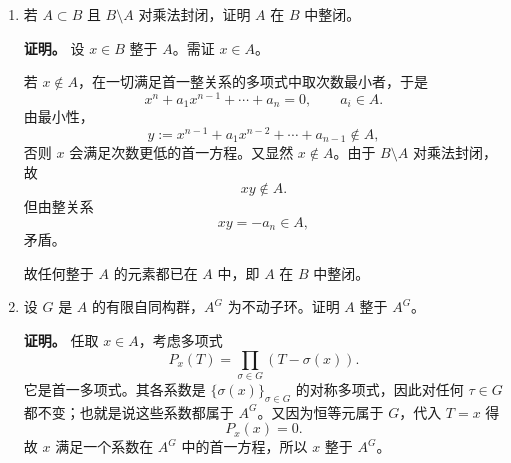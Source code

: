 \documentclass[a4paper]{ctexart}
\begin{document}
\begin{enumerate}[leftmargin=*, label=\textbf{5.\arabic*.}]
\textbf{证明。}
\begin{enumerate}[label=(\roman*)]
\item 设 \(x^{-1}\in B\)。因为 \(B\) 整于 \(A\)，故 \(x^{-1}\) 整于 \(A\)。于是存在首一方程
\[
(x^{-1})^n+a_1(x^{-1})^{n-1}+\cdots+a_n=0,\qquad a_i\in A.
\]
两边乘以 \(x^{n-1}\)，得
\[
x^{-1}+a_1+a_2x+\cdots+a_nx^{n-1}=0,
\]
即
\[
x^{-1}=-(a_1+a_2x+\cdots+a_nx^{n-1})\in A.
\]
所以 \(x\) 在 \(A\) 中可逆。

\item 先证 \(J(B)\cap A\subseteq J(A)\)。取 \(a\in J(B)\cap A\)。要证 \(a\) 落在 \(A\) 的每个极大理想中。任取极大理想 \(m\subset A\)。由 lying-over，即 (III.Thm 4.1.14)，存在极大理想 \(n\subset B\) 使 \(n\cap A=m\)；极大性可用 (III.Cor 4.1.12)。由于 \(a\in J(B)\subseteq n\)，故 \(a\in n\cap A=m\)。所以 \(a\in J(A)\)。

再证 \(J(A)\subseteq J(B)\cap A\)。取 \(a\in J(A)\)。任取 \(B\) 的极大理想 \(n\)，则 \(m=n\cap A\) 由 (III.Cor 4.1.12) 为极大理想。因 \(a\in J(A)\subseteq m\subseteq n\)，故 \(a\) 落在所有极大理想 \(n\) 中，即 \(a\in J(B)\)。

综上，
\[
J(A)=J(B)\cap A.
\]
\end{enumerate}

\setcounter{enumi}{6}
\item 若 \(A\subset B\) 且 \(B\setminus A\) 对乘法封闭，证明 \(A\) 在 \(B\) 中整闭。

\textbf{证明。}
设 \(x\in B\) 整于 \(A\)。需证 \(x\in A\)。

若 \(x\notin A\)，在一切满足首一整关系的多项式中取次数最小者，于是
\[
x^n+a_1x^{n-1}+\cdots+a_n=0,\qquad a_i\in A.
\]
由最小性，
\[
y:=x^{n-1}+a_1x^{n-2}+\cdots+a_{n-1}\notin A,
\]
否则 \(x\) 会满足次数更低的首一方程。又显然 \(x\notin A\)。由于 \(B\setminus A\) 对乘法封闭，故
\[
xy\notin A.
\]
但由整关系
\[
xy=-a_n\in A,
\]
矛盾。

故任何整于 \(A\) 的元素都已在 \(A\) 中，即 \(A\) 在 \(B\) 中整闭。

\setcounter{enumi}{11}
\item 设 \(G\) 是 \(A\) 的有限自同构群，\(A^G\) 为不动子环。证明 \(A\) 整于 \(A^G\)。

\textbf{证明。}
任取 \(x\in A\)，考虑多项式
\[
P_x(T)=\prod_{\sigma\in G}(T-\sigma(x)).
\]
它是首一多项式。其各系数是 \(\{\sigma(x)\}_{\sigma\in G}\) 的对称多项式，因此对任何 \(\tau\in G\) 都不变；也就是说这些系数都属于 \(A^G\)。又因为恒等元属于 \(G\)，代入 \(T=x\) 得
\[
P_x(x)=0.
\]
故 \(x\) 满足一个系数在 \(A^G\) 中的首一方程，所以 \(x\) 整于 \(A^G\)。


\end{enumerate}
\end{document}
